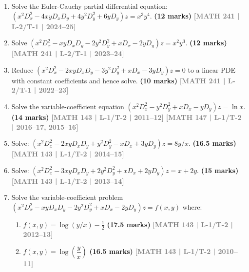 \documentclass[12pt]{article}
\newcommand{\yr}[1]{\hfill\textcolor{gray}{\small\textbf{[#1]}}}
\newcommand{\mk}[1]{\textcolor{orange!70!black}{\small\textbf{(#1 marks)}}}
\begin{document}
\begin{enumerate}


\item Solve the Euler-Cauchy partial differential equation:
$(x^{2}D_{x}^{2}-4xyD_{x}D_{y}+4y^{2}D_{y}^{2}+6yD_{y})z=x^{3}y^{4}.$
\mk{12} \yr{MATH 241 | L-2/T-1 | 2024--25}






\item Solve $(x^{2}D_{x}^{2}-xyD_{x}D_{y}-2y^{2}D_{y}^{2}+xD_{x}-2yD_{y})z=x^{2}y^{3}$.
\mk{12} \yr{MATH 241 | L-2/T-1 | 2023--24}








\item Reduce $(x^{2}D_{x}^{2}-2xyD_{x}D_{y}-3y^{2}D_{y}^{2}+xD_{x}-3yD_{y})z=0$ to a linear PDE with constant coefficients and hence solve.
\mk{10} \yr{MATH 241 | L-2/T-1 | 2022--23}





\item Solve the variable-coefficient equation $(x^{2}D_{x}^{2}-y^{2}D_{y}^{2}+xD_{x}-yD_{y})z=\ln x$.
\mk{14} \yr{MATH 143 | L-1/T-2 | 2011--12} \yr{MATH 147 | L-1/T-2 | 2016--17, 2015--16}



\item Solve: $(x^{2}D_{x}^{2}-2xyD_{x}D_{y}+y^{2}D_{y}^{2}-xD_{x}+3yD_{y})z=8y/x$.
\mk{16.5} \yr{MATH 143 | L-1/T-2 | 2014--15}






\item Solve: $(x^{2}D_{x}^{2}-3xyD_{x}D_{y}+2y^{2}D_{y}^{2}+xD_{x}+2yD_{y})z=x+2y$.
\mk{15} \yr{MATH 143 | L-1/T-2 | 2013--14}





\item Solve the variable-coefficient problem $(x^{2}D_{x}^{2}-xyD_{x}D_{y}-2y^{2}D_{y}^{2}+xD_{x}-2yD_{y})z = f(x,y)$ where:
\begin{enumerate}
  \item $f(x,y) = \log(y/x)-\tfrac{1}{2}$ \mk{17.5} \yr{MATH 143 | L-1/T-2 | 2012--13}
  \item $f(x,y) = \log\left(\dfrac{y}{x}\right)$ \mk{16.5} \yr{MATH 143 | L-1/T-2 | 2010--11}
\end{enumerate}



\end{enumerate}
\end{document}
